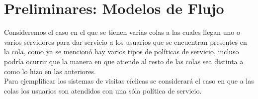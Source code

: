
%
\section{Preliminares: Modelos de Flujo}


Consideremos el caso en el que se tienen varias colas a las cuales
llegan uno o varios servidores para dar servicio a los usuarios
que se encuentran presentes en la cola, como ya se mencion\'o hay
varios tipos de pol\'iticas de servicio, incluso podr\'ia ocurrir
que la manera en que atiende al resto de las colas sea distinta a
como lo hizo en las anteriores.\\

Para ejemplificar los sistemas de visitas c\'iclicas se
considerar\'a el caso en que a las colas los usuarios son atendidos con
una s\'ola pol\'itica de servicio.\\



